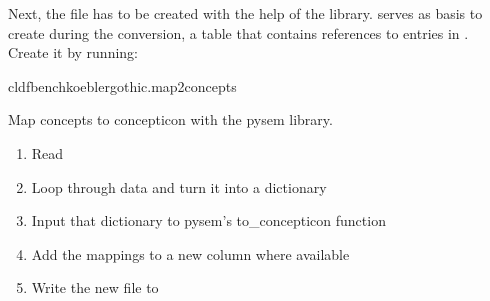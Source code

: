 \documentclass[letterpaper,10pt,english]{sphinxmanual}
\begin{document}
\sphinxAtStartPar
Next, the file  has to be created with the help of the
 library. 
serves as basis to create  during the conversion,
a table that contains references to entries in . Create it by running:

\begin{sphinxVerbatim}[commandchars=\\\{\}]
cldfbenchkoeblergothic.map2concepts
\end{sphinxVerbatim}
\label{\detokenize{mkcldf:module-koeblergothiccommands.map2concepts}}
\sphinxAtStartPar
Map concepts to concepticon with the pysem library.

\begin{fulllineitems}
\label{\detokenize{mkcldf:koeblergothiccommands.map2concepts.run}}
\pysigstartsignatures
{}
\pysigstopsignatures\begin{enumerate}
%
\item {} 
\sphinxAtStartPar
Read 

\item {} 
\sphinxAtStartPar
Loop through data and turn it into a dictionary

\item {} 
\sphinxAtStartPar
Input that dictionary to pysem’s to\_concepticon function

\item {} 
\sphinxAtStartPar
Add the mappings to a new column where available

\item {} 
\sphinxAtStartPar
Write the new file to 

\end{enumerate}

\end{fulllineitems}
\end{document}
